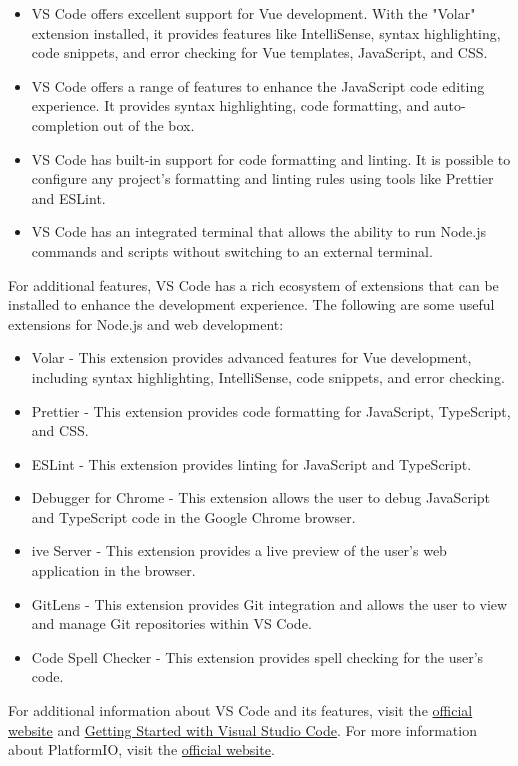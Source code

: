 \begin{itemize}
  \item \ac{VS Code} offers excellent support for Vue development. With the "Volar" extension installed, it provides features like IntelliSense, syntax highlighting, code snippets, and error checking for Vue templates, JavaScript, and CSS.
  \item \ac{VS Code} offers a range of features to enhance the JavaScript code editing experience. It provides syntax highlighting, code formatting, and auto-completion out of the box.
  \item \ac{VS Code} has built-in support for code formatting and linting. It is possible to configure any project's formatting and linting rules using tools like Prettier and ESLint.
  \item \ac{VS Code} has an integrated terminal that allows the ability to run Node.js commands and scripts without switching to an external terminal.
\end{itemize}
For additional features, \ac{VS Code} has a rich ecosystem of extensions that can be installed to enhance the development experience. The following are some useful extensions for Node.js and web development: 
\begin{itemize}
  \item Volar - This extension provides advanced features for Vue development, including syntax highlighting, IntelliSense, code snippets, and error checking.
  \item Prettier - This extension provides code formatting for JavaScript, TypeScript, and CSS.
  \item ESLint - This extension provides linting for JavaScript and TypeScript.
  \item Debugger for Chrome - This extension allows the user to debug JavaScript and TypeScript code in the Google Chrome browser.
  \item ive Server - This extension provides a live preview of the user's web application in the browser.
  \item GitLens - This extension provides Git integration and allows the user to view and manage Git repositories within \ac{VS Code}.
  \item Code Spell Checker - This extension provides spell checking for the user's code.
\end{itemize}
For additional information about \ac{VS Code} and its features, visit the \href{https://code.visualstudio.com/}{official website} and \href{https://code.visualstudio.com/docs}{Getting Started with Visual Studio Code}. For more information about PlatformIO, visit the \href{https://platformio.org/}{official website}.
